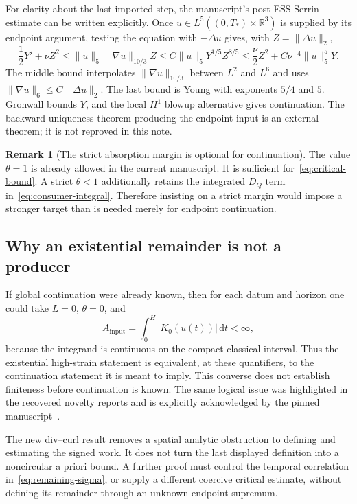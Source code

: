 \documentclass[11pt,a4paper]{article}
\theoremstyle{definition}
\newtheorem{remark}[theorem]{Remark}
\newcommand{\R}{\mathbb R}
\newcommand{\dt}{\,\mathrm dt}
\begin{document}
For clarity about the last imported step, the manuscript's post-ESS Serrin estimate can be written explicitly. Once $u\in L^5((0,T_*)\times\R^3)$ is supplied by its endpoint argument, testing the equation with $-\Delta u$ gives, with $Z=\|\Delta u\|_2$,
\[
 \frac12Y'+\nu Z^2
 \le\|u\|_5\|\nabla u\|_{10/3}Z
 \le C\|u\|_5Y^{1/5}Z^{8/5}
 \le\frac\nu2Z^2+C\nu^{-4}\|u\|_5^5Y.
\]
The middle bound interpolates $\|\nabla u\|_{10/3}$ between $L^2$ and $L^6$ and uses $\|\nabla u\|_6\le C\|\Delta u\|_2$. The last bound is Young with exponents $5/4$ and $5$. Gronwall bounds $Y$, and the local $H^1$ blowup alternative gives continuation. The backward-uniqueness theorem producing the endpoint input is an external theorem; it is not reproved in this note.

\begin{remark}[The strict absorption margin is optional for continuation]
The value $\theta=1$ is already allowed in the current manuscript. It is sufficient for~\eqref{eq:critical-bound}. A strict $\theta<1$ additionally retains the integrated $D_Q$ term in~\eqref{eq:consumer-integral}. Therefore insisting on a strict margin would impose a stronger target than is needed merely for endpoint continuation.
\end{remark}

\subsection{Why an existential remainder is not a producer}
If global continuation were already known, then for each datum and horizon one could take $L=0$, $\theta=0$, and
\[
 A_{\mathrm{input}}=\int_0^H|K_0(u(t))|\dt<\infty,
\]
because the integrand is continuous on the compact classical interval. Thus the existential high-strain statement is equivalent, at these quantifiers, to the continuation statement it is meant to imply. This converse does not establish finiteness before continuation is known. The same logical issue was highlighted in the recovered novelty reports and is explicitly acknowledged by the pinned manuscript~\cite{Paper,Survey2,Survey3}.

The new div--curl result removes a spatial analytic obstruction to defining and estimating the signed work. It does not turn the last displayed definition into a noncircular a priori bound. A further proof must control the temporal correlation in~\eqref{eq:remaining-sigma}, or supply a different coercive critical estimate, without defining its remainder through an unknown endpoint supremum.
\end{document}
